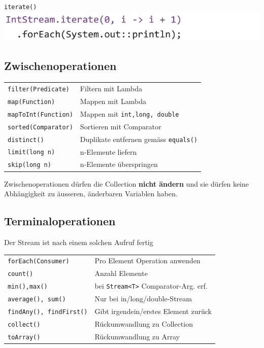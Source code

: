 \verb|iterate()| \\
\includegraphics[width=0.6\linewidth]{pictures/iterate.jpg}

\subsection{Zwischenoperationen}
\begin{tabular}{l l}
    \verb|filter(Predicate) | & Filtern mit Lambda \\
    \verb|map(Function)     | & Mappen mit Lambda \\
    \verb|mapToInt(Function)| & Mappen mit \verb|int,long, double| \\
    \verb|sorted(Comparator)| & Sortieren mit Comparator \\
    \verb|distinct()        | & Duplikate entfernen gemäss \verb|equals()| \\
    \verb|limit(long n)     | & n-Elemente liefern \\
    \verb|skip(long n)      | & n-Elemente überspringen \\
\end{tabular}
Zwischenoperationen dürfen die Collection \textbf{nicht ändern} und sie dürfen keine Abhängigkeit zu äusseren, änderbaren Variablen haben.

\subsection{Terminaloperationen}
Der Stream ist nach einem solchen Aufruf fertig
\begin{tabular}{l l}
    \verb|forEach(Consumer)     | & Pro Element Operation anwenden \\
    \verb|count()               | & Anzahl Elemente \\
    \verb|min(),max()           | & bei \verb|Stream<T>| Comparator-Arg. erf. \\
    \verb|average(), sum()      | & Nur bei in/long/double-Stream \\
    \verb|findAny(), findFirst()| & Gibt irgendein/erstes Element zurück \\
    \verb|collect()|              & Rückumwandlung zu Collection \\
    \verb|toArray()|              & Rückumwandlung zu Array \\
\end{tabular}

